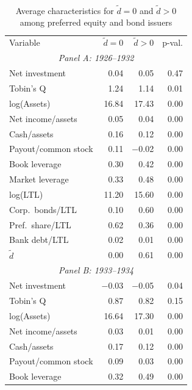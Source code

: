 \begin{table}[p]
\centering
\caption{\\ Average characteristics for $\tilde{d} = 0$ and $\tilde{d} > 0$ among preferred equity and bond issuers} \scriptsize \label{tab:sum_diff_pos}
    \begin{threeparttable}
        \begin{tabular}{lrrr}
            \toprule
            Variable & \ensuremath{\tilde{d}=0} & \ensuremath{\tilde{d}>0} & p-val. \\
            \multicolumn{4}{c}{\textit{Panel A: 1926--1932}} \\
            \midrule
            Net investment & 0.04 & 0.05 & 0.47 \\
            Tobin's Q & 1.24 & 1.14 & 0.01 \\
            log(Assets) & 16.84 & 17.43 & 0.00 \\
            Net income/assets & 0.05 & 0.04 & 0.00 \\
            Cash/assets & 0.16 & 0.12 & 0.00 \\
            Payout/common stock & 0.11 & $-$0.02 & 0.00 \\
            Book leverage & 0.30 & 0.42 & 0.00 \\
            Market leverage & 0.33 & 0.48 & 0.00 \\
            log(LTL) & 11.20 & 15.60 & 0.00 \\
            Corp.\ bonds/LTL & 0.10 & 0.60 & 0.00 \\
            Pref.\ share/LTL & 0.62 & 0.36 & 0.00 \\
            Bank debt/LTL & 0.02 & 0.01 & 0.00 \\
            \ensuremath{\tilde{d}} & 0.00 & 0.61 & 0.00 \\
            \midrule
            \multicolumn{4}{c}{\textit{Panel B: 1933--1934}} \\
            \midrule
            Net investment & $-$0.03 & $-$0.05 & 0.04 \\
            Tobin's Q & 0.87 & 0.82 & 0.15 \\
            log(Assets) & 16.64 & 17.30 & 0.00 \\
            Net income/assets & 0.03 & 0.01 & 0.00 \\
            Cash/assets & 0.17 & 0.12 & 0.00 \\
            Payout/common stock & 0.09 & 0.03 & 0.00 \\
            Book leverage & 0.32 & 0.49 & 0.00 \\

\end{tabular}
\end{threeparttable}
\end{table}
